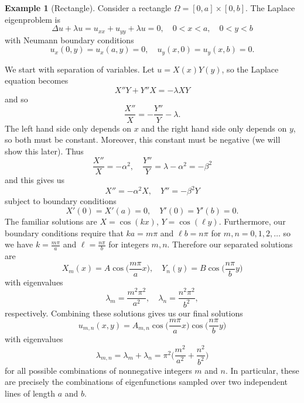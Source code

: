 \documentclass{article}
\numberwithin{equation}{section}
\theoremstyle{definition}
\newtheorem{exmp}[thm]{Example}
\begin{document}
\begin{exmp}[Rectangle]
Consider a rectangle $\Omega = [0, a] \times [0, b]$. The Laplace eigenproblem is
\begin{equation}\label{laplace_eq1}
\Delta u + \lambda u = u_{xx} + u_{yy} + \lambda u = 0, \quad 0 < x < a, \quad 0 < y < b
\end{equation}
with Neumann boundary conditions
\begin{equation}\label{boundary_cond1}
u_x(0,y) = u_x(a,y) = 0, \quad u_y(x,0) = u_y(x,b) = 0.
\end{equation}

We start with separation of variables. Let $u = X(x)Y(y)$, so the Laplace equation becomes
\begin{equation}
    X''Y + Y''X = -\lambda XY
\end{equation}
and so
\begin{equation}
   \frac{X''}{X} = -\frac{Y''}{Y} - \lambda.
\end{equation}
The left hand side only depends on $x$ and the right hand side only depends on $y$, so both must be constant. Moreover, this constant must be negative (we will show this later). Thus
\begin{equation}\label{eq2}
    \frac{X''}{X} = -\alpha^2, \quad \frac{Y''}{Y} = \lambda - \alpha^2 = -\beta^2
\end{equation}
and this gives us
\begin{equation}\label{eq3}
X'' = -\alpha^2 X, \quad Y'' = -\beta^2 Y
\end{equation}
subject to boundary conditions
\begin{equation}
X'(0) = X'(a) = 0, \quad Y'(0) = Y'(b) = 0.
\end{equation}
The familiar solutions are $X = \cos(kx)$, $Y = \cos(\ell y)$. Furthermore, our boundary conditions require that $ka = m\pi$ and $\ell b = n\pi$ for $m,n = 0, 1, 2, \ldots$ so we have $k = \frac{m\pi}{a}$ and $\ell = \frac{n\pi}{b}$ for integers $m,n$. Therefore our separated solutions are
\begin{equation}
X_m(x) = A\cos\bigg(\frac{m\pi}{a}x\bigg), \quad Y_n(y) = B\cos\bigg(\frac{n\pi}{b}y\bigg)
\end{equation}
with eigenvalues
\begin{equation}
\lambda_m = \frac{m^2\pi^2}{a^2}, \quad \lambda_n = \frac{n^2\pi^2}{b^2},
\end{equation}
respectively. Combining these solutions gives us our final solutions
\begin{equation}\label{eq4}
u_{m,n}(x,y) = A_{m,n}\cos\bigg(\frac{m\pi}{a}x\bigg)\cos\bigg(\frac{n\pi}{b}y\bigg)
\end{equation}
with eigenvalues
\begin{equation}\label{eq5}
\lambda_{m,n} = \lambda_m + \lambda_n = \pi^2\bigg(\frac{m^2}{a^2} + \frac{n^2}{b^2}\bigg)
\end{equation}
for all possible combinations of nonnegative integers $m$ and $n$. In particular, these are precisely the combinations of eigenfunctions sampled over two independent lines of length $a$ and $b$.


\end{exmp}
\end{document}
